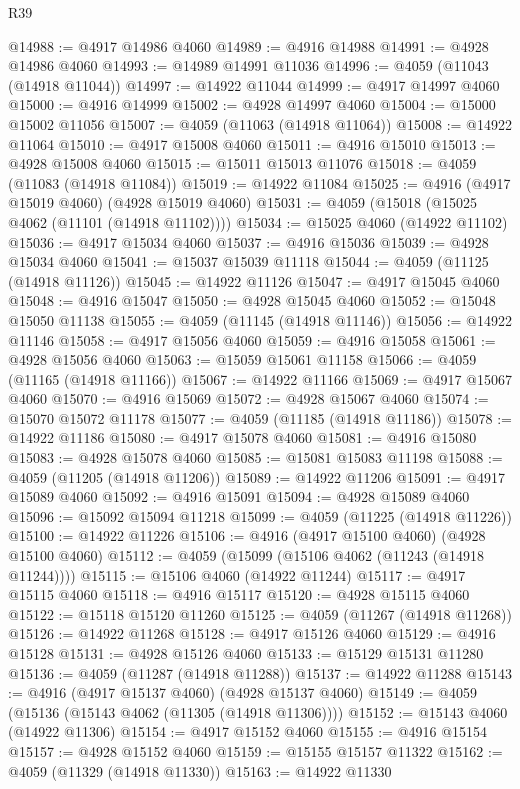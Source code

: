 \begin{lexlean}{R39}
\begin{coremodule}
@14988 := @4917 @14986 @4060
@14989 := @4916 @14988
@14991 := @4928 @14986 @4060
@14993 := @14989 @14991 @11036
@14996 := @4059 (@11043 (@14918 @11044))
@14997 := @14922 @11044
@14999 := @4917 @14997 @4060
@15000 := @4916 @14999
@15002 := @4928 @14997 @4060
@15004 := @15000 @15002 @11056
@15007 := @4059 (@11063 (@14918 @11064))
@15008 := @14922 @11064
@15010 := @4917 @15008 @4060
@15011 := @4916 @15010
@15013 := @4928 @15008 @4060
@15015 := @15011 @15013 @11076
@15018 := @4059 (@11083 (@14918 @11084))
@15019 := @14922 @11084
@15025 := @4916 (@4917 @15019 @4060) (@4928 @15019 @4060)
@15031 := @4059 (@15018 (@15025 @4062 (@11101 (@14918 @11102))))
@15034 := @15025 @4060 (@14922 @11102)
@15036 := @4917 @15034 @4060
@15037 := @4916 @15036
@15039 := @4928 @15034 @4060
@15041 := @15037 @15039 @11118
@15044 := @4059 (@11125 (@14918 @11126))
@15045 := @14922 @11126
@15047 := @4917 @15045 @4060
@15048 := @4916 @15047
@15050 := @4928 @15045 @4060
@15052 := @15048 @15050 @11138
@15055 := @4059 (@11145 (@14918 @11146))
@15056 := @14922 @11146
@15058 := @4917 @15056 @4060
@15059 := @4916 @15058
@15061 := @4928 @15056 @4060
@15063 := @15059 @15061 @11158
@15066 := @4059 (@11165 (@14918 @11166))
@15067 := @14922 @11166
@15069 := @4917 @15067 @4060
@15070 := @4916 @15069
@15072 := @4928 @15067 @4060
@15074 := @15070 @15072 @11178
@15077 := @4059 (@11185 (@14918 @11186))
@15078 := @14922 @11186
@15080 := @4917 @15078 @4060
@15081 := @4916 @15080
@15083 := @4928 @15078 @4060
@15085 := @15081 @15083 @11198
@15088 := @4059 (@11205 (@14918 @11206))
@15089 := @14922 @11206
@15091 := @4917 @15089 @4060
@15092 := @4916 @15091
@15094 := @4928 @15089 @4060
@15096 := @15092 @15094 @11218
@15099 := @4059 (@11225 (@14918 @11226))
@15100 := @14922 @11226
@15106 := @4916 (@4917 @15100 @4060) (@4928 @15100 @4060)
@15112 := @4059 (@15099 (@15106 @4062 (@11243 (@14918 @11244))))
@15115 := @15106 @4060 (@14922 @11244)
@15117 := @4917 @15115 @4060
@15118 := @4916 @15117
@15120 := @4928 @15115 @4060
@15122 := @15118 @15120 @11260
@15125 := @4059 (@11267 (@14918 @11268))
@15126 := @14922 @11268
@15128 := @4917 @15126 @4060
@15129 := @4916 @15128
@15131 := @4928 @15126 @4060
@15133 := @15129 @15131 @11280
@15136 := @4059 (@11287 (@14918 @11288))
@15137 := @14922 @11288
@15143 := @4916 (@4917 @15137 @4060) (@4928 @15137 @4060)
@15149 := @4059 (@15136 (@15143 @4062 (@11305 (@14918 @11306))))
@15152 := @15143 @4060 (@14922 @11306)
@15154 := @4917 @15152 @4060
@15155 := @4916 @15154
@15157 := @4928 @15152 @4060
@15159 := @15155 @15157 @11322
@15162 := @4059 (@11329 (@14918 @11330))
@15163 := @14922 @11330

\end{coremodule}
\end{lexlean}
